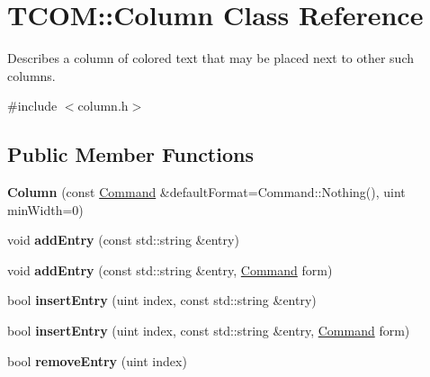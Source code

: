 \hypertarget{class_t_c_o_m_1_1_column}{\section{T\-C\-O\-M\-:\-:Column Class Reference}
\label{class_t_c_o_m_1_1_column}
}


Describes a column of colored text that may be placed next to other such columns.  




{\ttfamily \#include $<$column.\-h$>$}

\subsection*{Public Member Functions}
\begin{DoxyCompactItemize}
\item 
\hypertarget{class_t_c_o_m_1_1_column_af677d70a5fe2fa42ad6e698ba41b8a9d}{{\bfseries Column} (const \hyperlink{class_t_c_o_m_1_1_command}{Command} \&default\-Format=Command\-::\-Nothing(), uint min\-Width=0)}\label{class_t_c_o_m_1_1_column_af677d70a5fe2fa42ad6e698ba41b8a9d}

\item 
\hypertarget{class_t_c_o_m_1_1_column_a3dafb0a8daff97a3bc2b55365df8f3e9}{void {\bfseries add\-Entry} (const std\-::string \&entry)}\label{class_t_c_o_m_1_1_column_a3dafb0a8daff97a3bc2b55365df8f3e9}

\item 
\hypertarget{class_t_c_o_m_1_1_column_ab696a4e471863c4fb86c6f83eb14d6d0}{void {\bfseries add\-Entry} (const std\-::string \&entry, \hyperlink{class_t_c_o_m_1_1_command}{Command} form)}\label{class_t_c_o_m_1_1_column_ab696a4e471863c4fb86c6f83eb14d6d0}

\item 
\hypertarget{class_t_c_o_m_1_1_column_ad25618029d8112da10574b7f58a3d6a0}{bool {\bfseries insert\-Entry} (uint index, const std\-::string \&entry)}\label{class_t_c_o_m_1_1_column_ad25618029d8112da10574b7f58a3d6a0}

\item 
\hypertarget{class_t_c_o_m_1_1_column_abc25323ef15da76c333dfcf919596c65}{bool {\bfseries insert\-Entry} (uint index, const std\-::string \&entry, \hyperlink{class_t_c_o_m_1_1_command}{Command} form)}\label{class_t_c_o_m_1_1_column_abc25323ef15da76c333dfcf919596c65}

\item 
\hypertarget{class_t_c_o_m_1_1_column_aff808d9e70b5d54245f70a631bb772c5}{bool {\bfseries remove\-Entry} (uint index)}\label{class_t_c_o_m_1_1_column_aff808d9e70b5d54245f70a631bb772c5}


\end{DoxyCompactItemize}
